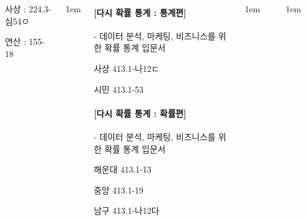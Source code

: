 \documentclass[	20pt, 
							a1paper, 
							portrait, %
							margin=0mm, %
							innermargin=10mm,  		%
							colspace=5mm, 
							subcolspace=0mm
							]{tikzposter}
\begin{document}
\begin{columns}
{\begin{LARGE}
사상  :  224.3-심54ㅇ %

연산  :  155-18    %



				\end{LARGE}
			}



			{
					\setlength{\leftmargini}{4em}
					\setlength{\labelsep} {1em}
				\begin{LARGE}

\paragraph{[다시 확률 통계 : 통계편]}
 - 데이터 분석, 마케팅, 비즈니스를 위한 확률 통계 입문서

사상    413.1-나12ㄷ

시민   413.1-53


\paragraph{[다시 확률 통계 : 확률편]}
 - 데이터 분석, 마케팅, 비즈니스를 위한 확률 통계 입문서

해운대  413.1-13

중앙   413.1-19

남구  413.1-나12다  


				\end{LARGE}
			} %




			{
					\setlength{\leftmargini}{4em}
					\setlength{\labelsep} {1em}
				\begin{LARGE}



				\end{LARGE}
			} %

			{
					\setlength{\leftmargini}{4em}
					\setlength{\labelsep} {1em}
				\begin{LARGE}


\end{LARGE}}
\end{columns}
\end{document}
